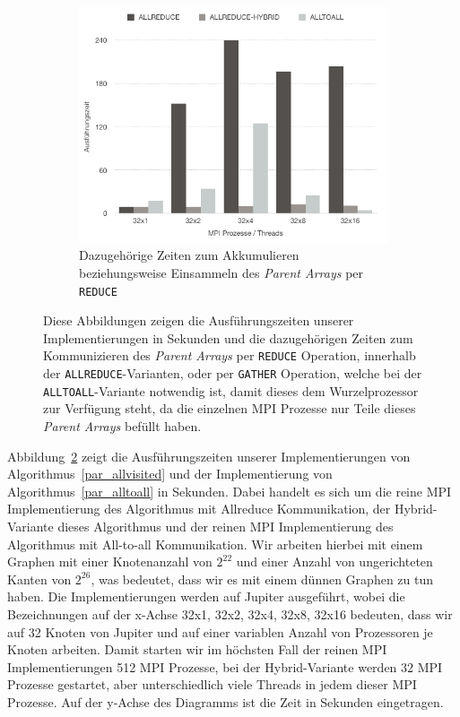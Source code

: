 \documentclass[11pt,a4paper]{article}
\begin{document}
\begin{figure}[t]
\begin{subfigure}[h]{0.48\textwidth}
        \includegraphics[width=1\textwidth]{reducing_parent}
        \caption{Dazugehörige Zeiten zum Akkumulieren beziehungsweise Einsammeln des \textit{Parent Arrays} per \lstinline{REDUCE}}
        \label{fig:reducing1}
    \end{subfigure}
    \caption{Diese Abbildungen zeigen die Ausführungszeiten unserer Implementierungen in Sekunden und die dazugehörigen Zeiten zum Kommunizieren des \textit{Parent Arrays} per \lstinline{REDUCE} Operation, innerhalb der \lstinline{ALLREDUCE}-Varianten, oder per \lstinline{GATHER} Operation, welche bei der \lstinline{ALLTOALL}-Variante notwendig ist, damit dieses dem Wurzelprozessor zur Verfügung steht, da die einzelnen MPI Prozesse nur Teile dieses \textit{Parent Arrays} befüllt haben.}
\label{fig:analyse1}
\end{figure}
Abbildung~\ref{fig:analyse1} zeigt die Ausführungszeiten unserer Implementierungen von Algorithmus~\ref{par_allvisited} und der Implementierung von Algorithmus~\ref{par_alltoall} in Sekunden. Dabei handelt es sich um die reine MPI Implementierung des Algorithmus mit Allreduce Kommunikation, der Hybrid-Variante dieses Algorithmus und der reinen MPI Implementierung des Algorithmus mit All-to-all Kommunikation. Wir arbeiten hierbei mit einem Graphen mit einer Knotenanzahl von \(2^{22}\) und einer Anzahl von ungerichteten Kanten von \(2^{26}\), was bedeutet, dass wir es mit einem dünnen Graphen zu tun haben. Die Implementierungen werden auf Jupiter ausgeführt, wobei die Bezeichnungen auf der x-Achse 32x1, 32x2, 32x4, 32x8, 32x16 bedeuten, dass wir auf 32 Knoten von Jupiter und auf einer variablen Anzahl von Prozessoren je Knoten arbeiten. Damit starten wir im höchsten Fall der reinen MPI Implementierungen 512 MPI Prozesse, bei der Hybrid-Variante werden 32 MPI Prozesse gestartet, aber unterschiedlich viele Threads in jedem dieser MPI Prozesse. Auf der y-Achse des Diagramms ist die Zeit in Sekunden eingetragen.\\
\end{document}
